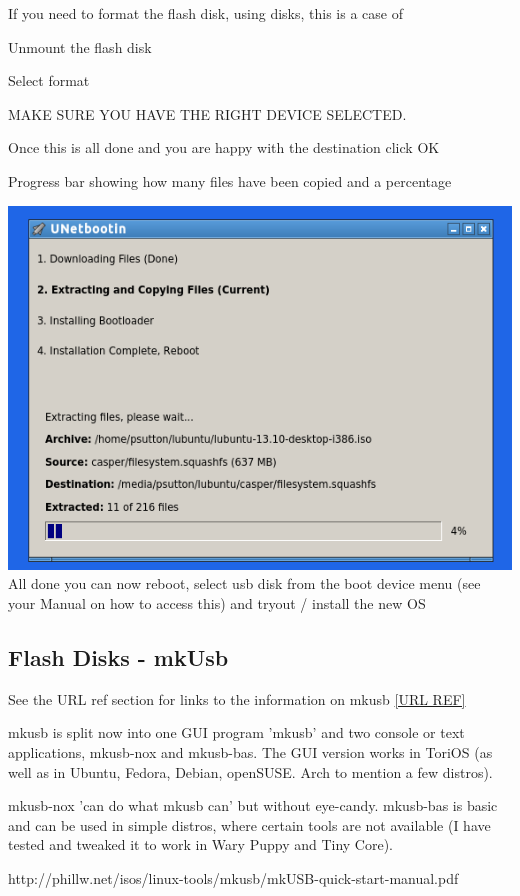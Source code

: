 \documentclass[12pt,a4paper]{book}
\begin{document}
If you need to format the flash disk, using disks, this is a case of

Unmount the flash disk

Select format

MAKE SURE YOU HAVE THE RIGHT DEVICE SELECTED.

Once this is all done and you are happy with the destination click OK

Progress bar showing how many files have been copied and a percentage


\includegraphics[width=0.7\linewidth]{unetbootin5} \\

All done you can now reboot, select usb disk from the boot device menu (see your Manual on how to access this) and tryout /  install the new OS


\subsection{Flash Disks - mkUsb}

See the URL ref section for links to the information on mkusb \ref{URL REF}

mkusb is split now into one GUI program 'mkusb' and two console or text
applications, mkusb-nox and mkusb-bas. The GUI version works in ToriOS
(as well as in Ubuntu, Fedora, Debian, openSUSE. Arch to mention a few
distros).

mkusb-nox 'can do what mkusb can' but without eye-candy. mkusb-bas is
basic and can be used in simple distros, where certain tools are not
available (I have tested and tweaked it to work in Wary Puppy and Tiny
Core).

http://phillw.net/isos/linux-tools/mkusb/mkUSB-quick-start-manual.pdf
\end{document}

